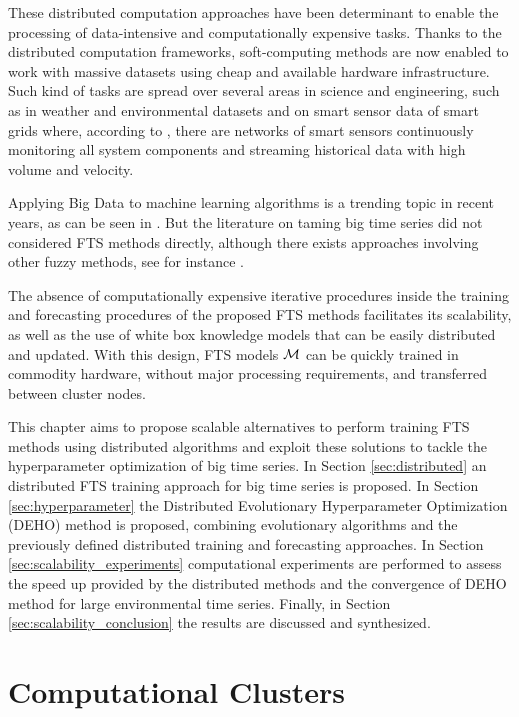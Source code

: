 These distributed computation approaches have been determinant to enable the processing of data-intensive and computationally expensive tasks. Thanks to the distributed computation frameworks, soft-computing methods are now enabled to work with massive datasets using cheap and available hardware infrastructure. Such kind of tasks are spread over several areas in science and engineering, such as in weather and environmental datasets and on smart sensor data of smart grids where, according to \cite{Coelho2016}, there are networks of smart sensors continuously monitoring all system components and streaming historical data with high volume and velocity. 

Applying Big Data to machine learning algorithms is a trending topic in recent years, as can be seen in \cite{Zhou2017}. But the literature on taming big time series did not considered FTS methods directly, although there exists approaches involving other fuzzy methods, see for instance \cite{Singh2015}.

The absence of computationally expensive iterative procedures inside the training and forecasting procedures of the proposed FTS methods facilitates its scalability, as well as the use of white box knowledge models that can be easily distributed and updated. With this design, FTS models $\mathcal{M}$ can be quickly trained in commodity hardware, without major processing requirements, and transferred between cluster nodes. 

This chapter aims to propose scalable alternatives to perform  training FTS methods using distributed algorithms and exploit  these solutions to tackle the hyperparameter optimization of big time series. In Section \ref{sec:distributed} an distributed FTS training approach for big time series is proposed. In Section \ref{sec:hyperparameter} the Distributed Evolutionary Hyperparameter Optimization (DEHO) method is proposed, combining evolutionary algorithms and the previously defined distributed training and forecasting approaches. In Section \ref{sec:scalability_experiments} computational experiments are performed to assess the speed up provided by the distributed methods and the convergence of DEHO method for large environmental time series. Finally, in Section \ref{sec:scalability_conclusion} the results are discussed and synthesized.

\section{Computational Clusters}

